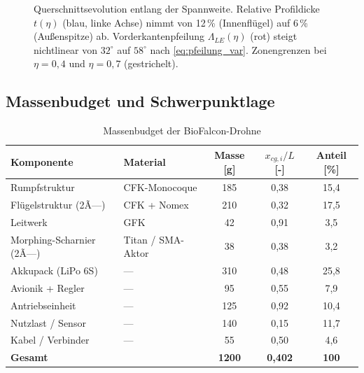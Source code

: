 ﻿\documentclass[12pt,a4paper]{article}
\theoremstyle{remark}
\begin{document}
\begin{figure}[H]
		\caption{Querschnittsevolution entlang der Spannweite. Relative Profildicke $t(\eta)$
			(blau, linke Achse) nimmt von 12\,\% (Innenflügel) auf 6\,\% (Außenspitze) ab.
			Vorderkantenpfeilung $\Lambda_{LE}(\eta)$ (rot) steigt nichtlinear von $32^{\circ}$
			auf $58^{\circ}$ nach \cref{eq:pfeilung_var}. Zonengrenzen bei $\eta=0{,}4$ und
			$\eta=0{,}7$ (gestrichelt).}
		\label{fig:querschnitt_evolution}
	\end{figure}
	
	\subsection{Massenbudget und Schwerpunktlage}
	\label{sec:masse}
	
	\begin{table}[H]
		\centering
		\caption{Massenbudget der BioFalcon-Drohne}
		\label{tab:masse}
		\begin{tabular}{llccc}
			\toprule
			\textbf{Komponente} & \textbf{Material} &
			\textbf{Masse [g]} & \textbf{$x_{cg,i}/L$ [-]} &
			\textbf{Anteil [\%]} \\
			\midrule
			Rumpfstruktur          & CFK-Monocoque      & 185 & 0{,}38 & 15{,}4 \\
			Flügelstruktur (2Ã—)    & CFK + Nomex        & 210 & 0{,}32 & 17{,}5 \\
			Leitwerk               & GFK                &  42 & 0{,}91 &  3{,}5 \\
			Morphing-Scharnier (2Ã—)& Titan / SMA-Aktor  &  38 & 0{,}38 &  3{,}2 \\
			Akkupack (LiPo 6S)     & ---                & 310 & 0{,}48 & 25{,}8 \\
			Avionik + Regler       & ---                &  95 & 0{,}55 &  7{,}9 \\
			Antriebseinheit        & ---                & 125 & 0{,}92 & 10{,}4 \\
			Nutzlast / Sensor      & ---                & 140 & 0{,}15 & 11{,}7 \\
			Kabel / Verbinder      & ---                &  55 & 0{,}50 &  4{,}6 \\
			\midrule
			\textbf{Gesamt}        &                    & \textbf{1200} &
			\textbf{0{,}402} & \textbf{100} \\
			\bottomrule
		\end{tabular}
	\end{table}
	
\end{document}
